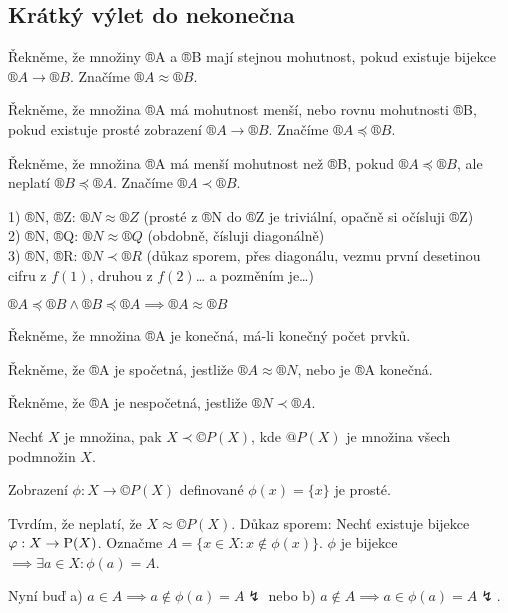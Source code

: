 \documentclass[12pt]{article}					%
\begin{document}

    \subsection{Krátký výlet do nekonečna}
        \begin{definice}
            Řekněme, že množiny ®A a ®B mají stejnou mohutnost, pokud existuje bijekce $®A \rightarrow ®B$. Značíme $®A \approx ®B$.

            Řekněme, že množina ®A má mohutnost menší, nebo rovnu mohutnosti ®B, pokud existuje prosté zobrazení $®A \rightarrow ®B$. Značíme $®A \preceq ®B$.

            Řekněme, že množina ®A má menší mohutnost než ®B, pokud $®A \preceq ®B$, ale neplatí $®B \preceq ®A$. Značíme $®A \prec ®B$.

            \begin{prikladyin}
                    1) ®N, ®Z: $®N \approx ®Z$ (prosté z ®N do ®Z je triviální, opačně si očísluji ®Z)\\
                    2) ®N, ®Q: $®N \approx ®Q$ (obdobně, čísluji diagonálně)\\
                    3) ®N, ®R: $®N \prec ®R$ (důkaz sporem, přes diagonálu, vezmu první desetinou cifru z $f(1)$, druhou z $f(2)$… a pozměním je…)
            \end{prikladyin}
        \end{definice}

        \begin{tvrzeni}
            $®A \preceq ®B \land ®B \preceq ®A \implies ®A \approx ®B$
        \end{tvrzeni}

        \begin{definice}
            Řekněme, že množina ®A je konečná, má-li konečný počet prvků.

            Řekněme, že ®A je spočetná, jestliže $®A \approx ®N$, nebo je ®A konečná.

            Řekněme, že ®A je nespočetná, jestliže $®N \prec ®A$.
        \end{definice}

        \begin{tvrzeni}[Cantor]
            Nechť $X$ je množina, pak $X \prec ©P(X)$, kde $@P(X)$ je množina všech podmnožin $X$.
            \begin{dukazin}
                Zobrazení $\phi: X \rightarrow ©P(X)$ definované $\phi(x) = \{x\}$ je prosté.

                Tvrdím, že neplatí, že $X \approx ©P(X)$. Důkaz sporem: Nechť existuje bijekce $\phi: X \rightarrow \P(X)$. Označme $A = \{x \in X: x \notin \phi(x)\}$. $\phi$ je bijekce $\implies \exists a \in X: \phi(a) = A$.

                        Nyní buď a) $a \in A \implies a \notin \phi(a) = A \lightning$ nebo b) $a \notin A \implies a \in \phi(a) = A \lightning$.
            \end{dukazin}
        \end{tvrzeni}
\end{document}
